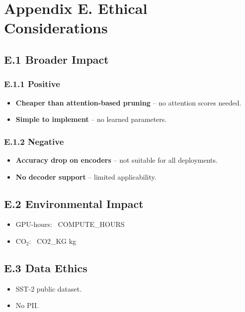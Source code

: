
\section{Appendix E. Ethical Considerations}

\subsection{E.1 Broader Impact}

\subsubsection{E.1.1 Positive}

\begin{itemize}
\item \textbf{Cheaper than attention-based pruning} -- no attention scores needed.
\item \textbf{Simple to implement} -- no learned parameters.

\end{itemize}
\subsubsection{E.1.2 Negative}

\begin{itemize}
\item \textbf{Accuracy drop on encoders} -- not suitable for all deployments.
\item \textbf{No decoder support} -- limited applicability.

\end{itemize}
\subsection{E.2 Environmental Impact}

\begin{itemize}
\item GPU-hours: ~{{COMPUTE\_HOURS}}
\item CO$_2$: ~{{CO2\_KG}} kg

\end{itemize}
\subsection{E.3 Data Ethics}

\begin{itemize}
\item SST-2 public dataset.
\item No PII.

\end{itemize}
